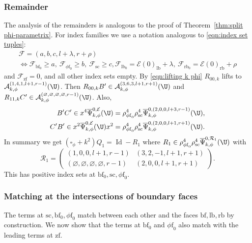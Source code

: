 \documentclass[JEP,XML,SOM,Unicode,NoFloatCountersInSection,published]{cedram}
\theoremstyle{plain}
\theoremstyle{definition}
\newcommand\calA{{\mathcal A}}
\newcommand\calE{{\mathcal E}}
\newcommand\calF{{\mathcal F}}
\newcommand\calR{{\mathcal R}}
\newcommand{\phif}{{\phi\mathrm{f}}}
\newcommand{\lf}{{\mathrm{lb}}}
\newcommand{\rf}{{\mathrm{rb}}}
\newcommand{\lfz}{{\mathrm{lb}_0}}
\newcommand{\rfz}{{\mathrm{rb}_0}}
\newcommand{\bbf}{{\mathrm{bf}}}
\newcommand{\bbfz}{{\bbf_0}}
\newcommand{\ssc}{{\mathrm{sc}}}
\newcommand{\zf}{{\mathrm{zf}}}
\DeclareMathOperator{\Id}{Id}
\newcommand{\Psibar}{\overline{\Psi}}
\begin{document}
\subsubsection*{Remainder}
The analysis of the remainders is analogous to the proof of Theorem~\ref{thm:split phi-parametrix}. For index families we use a notation analogous to \eqref{eqn:index set tuples}:
\begin{multline}
\label{eqn:index set tuples k phi}
\calF = (a,b,c,l+\lambda,r+\rho)\\
\iff
\calF_{\bbf_0}\geq a,\ \calF_{\phif_0}\geq b,\ \calF_\ssc\geq c,\calF_\lfz=\calE(0)_\lf+\lambda,\ \calF_\rfz=\calE(0)_\rf+\rho
\end{multline}
and $\calF_\zf=0$, and all other index sets empty.
By \eqref{eqn:lifting k phi} $R_{00,k}$ lifts to $\calA_{k,\phi}^{(1,4,1,l+1,r-1)}(\U)$.
Then $R_{00,k}B'\in\calA_{k,\phi}^{(3,6,3,l+1,r+1)}(\U)$ and $R_{11,k}C' \in \calA_{k,\phi}^{(\varnothing,\varnothing,\varnothing,\varnothing,r-1)}(\U)$. Also,
\begin{align*}
B'C'\in x^4\Psibar_{k,\phi}^{0,\calE}(\U)&=
\rho_{\phif_0}^4\rho_\ssc^4 \Psibar_{k,\phi}^{0,(2,0,0,l+3,r-1)}(\U), \\
C'B'\in x^2\Psibar_{k,\phi}^{0,\calE}(\U)x^2 &= \rho_{\phif_0}^4
\rho_\ssc^4\Psibar_{k,\phi}^{0,(2,0,0,l+1,r+1)}(\U).
\end{align*}
In summary we get
$(\square_\phi+k^2)Q_1=\Id - R_1$ where
$R_1\in\rho_{\phif_0}^4\rho_\ssc^4\Psibar_{k,\phi}^{0,\calR_1}(\U)$ with
\begin{equation}
\label{eqn:R1 k phi para}
\calR_1 =
\begin{pmatrix}
(1,0,0,l+1,r-1) & (3,2,-1,l+1,r+1) \\
(\varnothing,\varnothing,\varnothing,\varnothing,r-1) & (2,0,0,l+1,r+1)
\end{pmatrix}.
\end{equation}
This has positive index sets at $\bbf_0,\ssc,\phif_0$.

\subsubsection*{Matching at the intersections of boundary faces}
The terms at $\ssc,\bbfz, \phif_0$ match \hbox{between} each other and the faces $\bbf, \lf, \rf$ by construction.
We now show that the terms at $\bbfz$ and $\phif_0$ also match with the leading terms at $\zf$.
\end{document}
